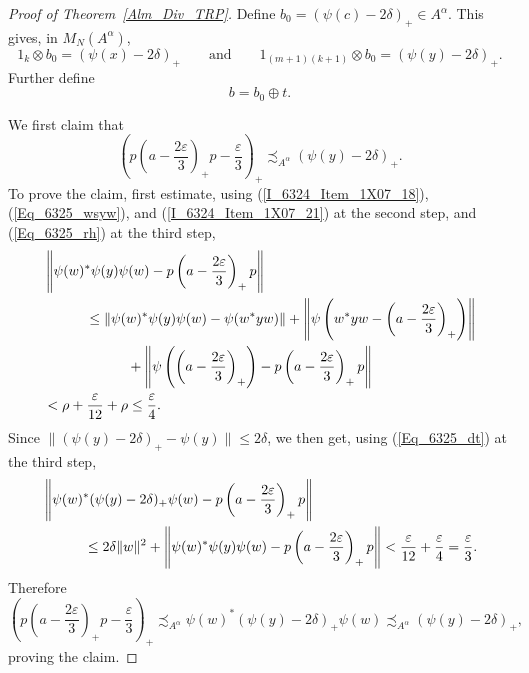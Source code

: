 \documentclass[10pt]{amsart}
\numberwithin{equation}{section}
\theoremstyle{definition}
\newcommand{\af}{\alpha}
\newcommand{\dt}{\delta}
\newcommand{\ep}{\varepsilon}
\newcommand{\ps}{\psi}
\newcommand{\rh}{\rho}
\newcommand{\andeqn}{\qquad {\mbox{and}} \qquad}
\begin{document}
\begin{proof}[Proof of Theorem~\ref{Alm_Div_TRP}]
Define $b_0 = (\ps (c) - 2 \dt)_{+} \in A^{\alpha}$.
This gives, in $M_N (A^{\alpha})$,
%
\begin{equation}\label{Eq_6325_b0_mult}
1_k \otimes b_0 = (\ps (x) - 2 \dt)_{+}
\andeqn
1_{(m + 1) (k + 1)} \otimes b_0 = (\ps (y) - 2 \dt)_{+}.
\end{equation}
%
Further define
%
\begin{equation}\label{Eq_6325_b_Dfn}
b = b_0 \oplus t.
\end{equation}
%

We first claim that
\[
\left( p \left( a - \frac{2 \ep}{3} \right)_+ p - \frac{\ep}{3} \right)_+
\precsim_{A^{\af}} (\ps (y) - 2 \dt)_{+}.
\]
To prove the claim, first estimate,
using (\ref{I_6324_Item_1X07_18}), (\ref{Eq_6325_wsyw}),
and (\ref{I_6324_Item_1X07_21}) at the second step,
and (\ref{Eq_6325_rh}) at the third step,
\[
\begin{split}
& \left\| \ps (w)^* \ps (y) \ps (w)
  - p \left( a - \frac{2 \ep}{3} \right)_+ p \right\|
\\
& \hspace*{3em} {\mbox{}}
 \leq \| \ps (w)^* \ps (y) \ps (w) - \ps (w^* y w) \|
    + \left\| \ps \left( w^* y w
         - \left( a - \frac{2 \ep}{3} \right)_+ \right) \right\|
 \\
& \hspace*{6em} {\mbox{}}
  + \left\| \ps \left( \left( a - \frac{2 \ep}{3} \right)_+ \right)
     - p \left( a - \frac{2 \ep}{3} \right)_+ p \right\|
\\
& < \rh + \frac{\ep}{12} + \rh
  \leq \frac{\ep}{4}.
\end{split}
\]
Since $\| (\ps (y) - 2 \dt)_{+} - \ps (y) \| \leq 2 \dt$,
we then get, using (\ref{Eq_6325_dt}) at the third step,
\[
\begin{split}
& \left\| \ps (w)^* (\ps (y) - 2 \dt)_{+} \ps (w)
  - p \left( a - \frac{2 \ep}{3} \right)_+ p \right\|
\\
& \hspace*{3em} {\mbox{}}
 \leq 2 \dt \| w \|^2
 + \left\| \ps (w)^* \ps (y) \ps (w)
  - p \left( a - \frac{2 \ep}{3} \right)_+ p \right\|
 < \frac{\ep}{12} + \frac{\ep}{4}
  = \frac{\ep}{3}.
\end{split}
\]
Therefore
\[
\left( p \left( a - \frac{2 \ep}{3} \right)_+ p - \frac{\ep}{3} \right)_+
\precsim_{A^{\af}} \ps (w)^* (\ps (y) - 2 \dt)_{+} \ps (w)
\precsim_{A^{\af}} (\ps (y) - 2 \dt)_{+},
\]
proving the claim.


\end{proof}
\end{document}
